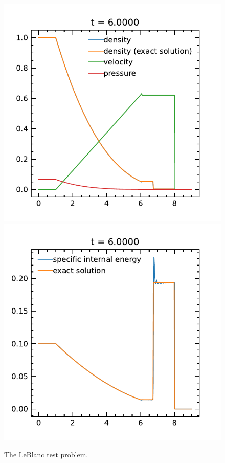 \documentclass[fleqn,usenatbib]{mnras}
\begin{document}
\begin{figure}
    \includegraphics[width=\columnwidth]{hydro_leblanc_6.0000.pdf}
    \includegraphics[width=\columnwidth]{hydro_leblanc_eint_6.0000.pdf}
    \caption{The LeBlanc test problem.}
    \label{fig:leblanc}
\end{figure}
\end{document}
